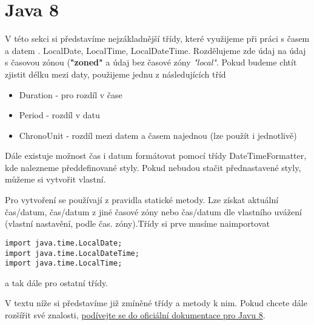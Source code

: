 \documentclass[11pt,a4paper,titlepage]{article}
\begin{document}
\section{Java 8}
V této sekci si představíme nejzákladnější třídy, které využijeme při práci s časem a datem . LocalDate, LocalTime, LocalDateTime. Rozdělujeme zde údaj na údaj s časovou zónou (\textbf{"zoned"} a údaj bez časové zóny \textit{"local"}. Pokud budeme chtít zjistit délku mezi daty, použijeme jednu z následujících tříd
\begin{itemize}
    \item Duration - pro rozdíl v čase
    \item Period - rozdíl v datu
    \item ChronoUnit - rozdíl mezi datem a časem najednou (lze použít i jednotlivě)
\end{itemize}
Dále existuje možnost čas i datum formátovat pomocí třídy DateTimeFormatter, kde nalezneme předdefinované styly. Pokud nebudou stačit přednastavené styly, můžeme si vytvořit vlastní.
\parencite{java7_overflow}

Pro vytvoření se používají z pravidla statické metody. Lze získat aktuální čas/datum, čas/datum z jiné časové zóny nebo čas/datum dle vlastního uvážení (vlastní nastavění, podle čas. zóny).Třídy si prve musíme naimportovat
\begin{verbatim}
import java.time.LocalDate;
import java.time.LocalDateTime;
import java.time.LocalTime;
\end{verbatim}
a tak dále pro ostatní třídy.

V textu níže si představíme již zmíněné třídy a metody k nim. Pokud chcete dále rozšířit své znalosti, \href{https://docs.oracle.com/javase/8/docs/}{podívejte se do oficiální dokumentace pro Javu 8}.
\end{document}
